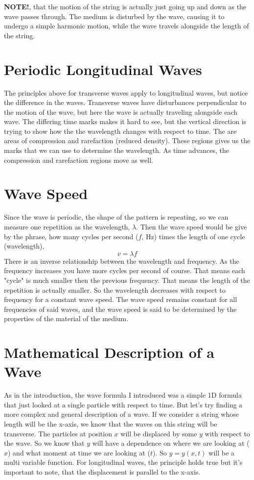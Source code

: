\textbf{NOTE!}, that the motion of the string is actually just going up and down as the wave passes through. The medium is disturbed by the wave, causing it to undergo a simple harmonic motion, while the wave travels alongside the length of the string. 


\section{Periodic Longitudinal Waves}
The principles above for transverse waves apply to longitudinal waves, but notice the difference in the waves. 
Transverse waves have disturbances perpendicular to the motion of the wave, but here the wave is actually traveling alongside each wave. The differing time marks makes it hard to see, but the vertical direction is trying to show how the the wavelength changes with respect to time. The are areas of compression and rarefaction (reduced density). These regions gives us the marks that we can use to determine the wavelength. As time advances, the compression and rarefaction regions move as well.  

\section{Wave Speed}
Since the wave is periodic, the shape of the pattern is repeating, so we can measure one repetition as the wavelength, $\lambda$. Then the wave speed would be give by the phrase, how many cycles per second ($f$, Hz) times the length of one cycle (wavelength), 
\begin{equation*}
v = \lambda f
\end{equation*} 
There is an inverse relationship between the wavelength and frequency. As the frequency increases you have more cycles per second of course. That means each "cycle" is much smaller then the previous frequency. That means the length of the repetition is actually smaller. So the wavelength decreases with respect to frequency for a constant wave speed. The wave speed remains constant for all frequencies of said waves, and the wave speed is said to be determined by the properties of the material of the medium.

\section{Mathematical Description of a Wave}
As in the introduction, the wave formula I introduced was a simple 1D formula that just looked at a single particle with respect to time. But let's try finding a more complex and general description of a wave. If we consider a string whose length will be the x-axis, we know that the waves on this string will be transverse. The particles at position $x$ will be displaced by some $y$ with respect to the wave. So we know that $y$ will have a dependence on where we are looking at ($x$) and what moment at time we are looking at ($t$). So $y=y(x,t)$ will be a multi variable function. For longitudinal waves, the principle holds true but it's important to note, that the displacement is parallel to the x-axis.

